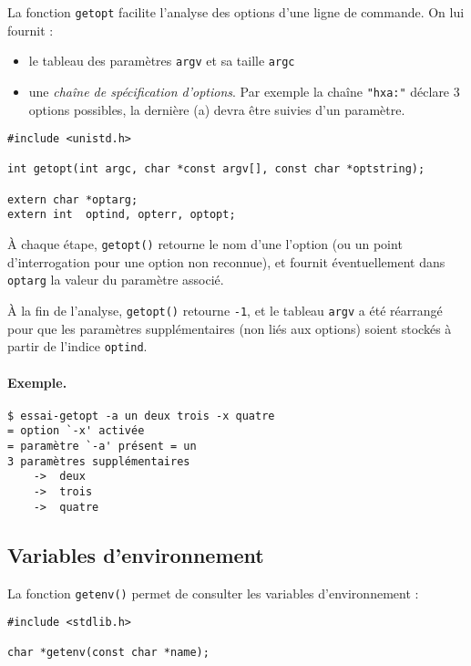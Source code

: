 La fonction \texttt{getopt} facilite l'analyse des options d'une ligne de commande. On lui fournit :

\begin{itemize}
\item   le tableau des  paramètres \texttt{argv} et sa taille
\texttt{argc}
\item une
\emph{chaîne de spécification d'options}.  Par exemple la chaîne
\texttt{"hxa:"} déclare 3 options possibles, la dernière (a) devra être
suivies d'un paramètre.
\end{itemize}


\extrait
\begin{lstlisting}
#include <unistd.h>

int getopt(int argc, char *const argv[], const char *optstring);

extern char *optarg;
extern int  optind, opterr, optopt;
\end{lstlisting}


À chaque étape, \texttt{getopt()} retourne le nom d'une l'option (ou un
point d'interrogation pour une option non reconnue), et fournit
éventuellement dans \texttt{optarg} la valeur du paramètre associé.

À la fin de l'analyse, \texttt{getopt()} retourne \texttt{-1}, et le
tableau \texttt{argv} a été réarrangé pour que les paramètres
supplémentaires (non liés aux options) soient stockés à
partir de l'indice \texttt{optind}.


\source



\paragraph*{Exemple.}

\extraitbash
\begin{lstlisting}
$ essai-getopt -a un deux trois -x quatre
= option `-x' activée
= paramètre `-a' présent = un
3 paramètres supplémentaires
    ->  deux
    ->  trois
    ->  quatre
\end{lstlisting}



\subsection{Variables d'environnement}

 
La fonction \texttt{getenv()} permet de
consulter les variables d'environnement : \extrait
\begin{lstlisting}
#include <stdlib.h>

char *getenv(const char *name);
\end{lstlisting}


